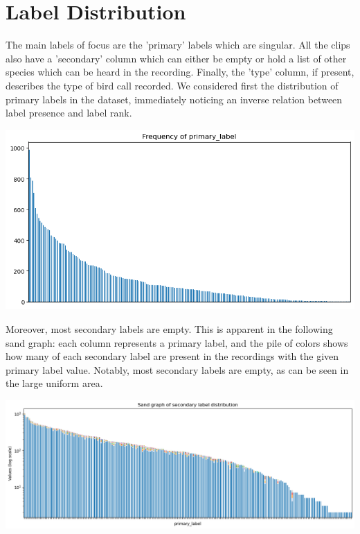 \documentclass[10pt]{article}
\begin{document}
\section*{Label Distribution}

\begin{minipage}{0.48\linewidth}
The main labels of focus are the 'primary' labels which are singular. All the clips also have a 'secondary' column which can either be empty or hold a list of other species which can be heard in the recording. Finally, the 'type' column, if present, describes the type of bird call recorded. We considered first the distribution of primary labels in the dataset, immediately noticing an inverse relation between label presence and label rank.
\end{minipage}
\hfill
\begin{minipage}{0.48\linewidth}
  \includegraphics[width=\linewidth]{img/train_primary_histogram.png}
\end{minipage}

\vspace{1em}

\begin{minipage}{0.48\linewidth}
Moreover, most secondary labels are empty. This is apparent in the following sand graph: each column represents a primary label, and the pile of colors shows how many of each secondary label are present in the recordings with the given primary label value. Notably, most secondary labels are empty, as can be seen in the large uniform area.
\end{minipage}
\hfill
\begin{minipage}{0.48\linewidth}
  \includegraphics[width=\linewidth]{img/train_secondary_sand.png}
\end{minipage}
\end{document}

